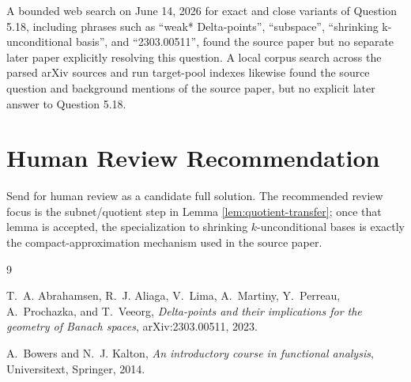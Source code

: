 \documentclass[11pt]{article}
\begin{document}
A bounded web search on June 14, 2026 for exact and close variants of Question
5.18, including phrases such as ``weak* Delta-points'', ``subspace'',
``shrinking k-unconditional basis'', and ``2303.00511'', found the source paper
but no separate later paper explicitly resolving this question.  A local corpus
search across the parsed arXiv sources and run target-pool indexes likewise
found the source question and background mentions of the source paper, but no
explicit later answer to Question 5.18.

\section*{Human Review Recommendation}

Send for human review as a candidate full solution.  The recommended review
focus is the subnet/quotient step in Lemma \ref{lem:quotient-transfer}; once
that lemma is accepted, the specialization to shrinking \(k\)-unconditional
bases is exactly the compact-approximation mechanism used in the source paper.

\begin{thebibliography}{9}

T.~A. Abrahamsen, R.~J. Aliaga, V.~Lima, A.~Martiny, Y.~Perreau,
A.~Prochazka, and T.~Veeorg,
\emph{Delta-points and their implications for the geometry of Banach spaces},
arXiv:2303.00511, 2023.

A.~Bowers and N.~J. Kalton,
\emph{An introductory course in functional analysis},
Universitext, Springer, 2014.

\end{thebibliography}
\end{document}

